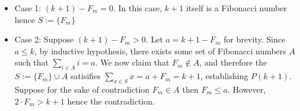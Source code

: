 \documentclass[10pt]{exam}
\begin{document}
\begin{parts}
\begin{customsolutionbox}
        \begin{itemize}
            \item Case 1:  $(k+1)-F_m = 0$. In this case, $k+1$ itself is a Fibonacci number hence $S := \{F_m\}$
            \item Case 2: Suppose $(k+1)- F_m > 0$. Let $a = k + 1 - F_m$ for brevity.
            Since $a \leq k$, by inductive hypothesis, there exists some set of Fibonacci numbers $A$ such that $\sum_{i \in A} i = a$.
            We now claim that $F_m \not \in A$, and therefore the $S := \{F_m\} \cup A$ satisifies $\sum_{x \in  S} x = a + F_m = k+1$, establishing $P(k+1)$. Suppose for the sake of contradiction $F_m \in A$ then $F_m \leq a$. However, $2 \cdot F_m > k+1$ hence the contradiction.
        \end{itemize}
    \end{customsolutionbox}
\end{parts}
\end{document}
